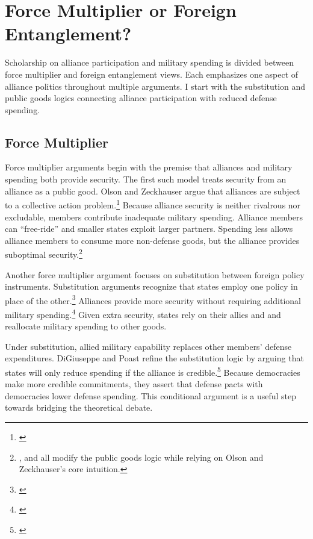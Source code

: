 \documentclass[12pt]{article}
\begin{document}
\section{Force Multiplier or Foreign Entanglement?}


Scholarship on alliance participation and military spending is divided between force multiplier and foreign entanglement views.
Each emphasizes one aspect of alliance politics throughout multiple arguments.  
I start with the substitution and public goods logics connecting alliance participation with reduced defense spending. 


\subsection{Force Multiplier} 


Force multiplier arguments begin with the premise that alliances and military spending both provide security.
The first such model treats security from an alliance as a public good. 
Olson and Zeckhauser argue that alliances are subject to a collective action problem.\footnote{\cite{OlsonZeckhauser1966}}
Because alliance security is neither rivalrous nor excludable, members contribute inadequate military spending. 
Alliance members can ``free-ride'' and smaller states exploit larger partners. 
Spending less allows alliance members to consume more non-defense goods, but the alliance provides suboptimal security.\footnote{\citet{SandlerForbes1980}, \citet{Oneal1990} and \citet{SandlerHartley2001} all modify the public goods logic while relying on Olson and Zeckhauser's core intuition.} 


Another force multiplier argument focuses on substitution between foreign policy instruments.
Substitution arguments recognize that states employ one policy in place of the other.\footnote{\cite{MostStarr1989}}
Alliances provide more security without requiring additional military spending.\footnote{\cite{Morrow1993, Conybeare1994}}
Given extra security, states rely on their allies and and reallocate military spending to other goods. 


Under substitution, allied military capability replaces other members' defense expenditures. 
DiGiuseppe and Poast refine the substitution logic by arguing that states will only reduce spending if the alliance is credible.\footnote{\cite{DigiuseppePoast2016}}
Because democracies make more credible commitments, they assert that defense pacts with democracies lower defense spending.
This conditional argument is a useful step towards bridging the theoretical debate. 
\end{document}
